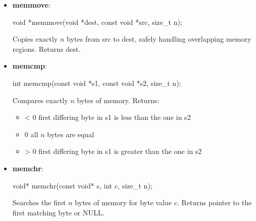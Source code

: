 \documentclass{report}
\begin{document}
\begin{itemize}
\begin{cppcode}
                    memcpy(dest, src, sizeof src);
            \end{cppcode}
            \bigbreak \noindent 
            Overlapping memory is UB.
        \item \textbf{memmove}: 
            \bigbreak \noindent 
            \begin{cppcode}
            void *memmove(void *dest, const void *src, size_t n);
            \end{cppcode}
            \bigbreak \noindent 
            Copies exactly $n$ bytes from src to dest, safely handling overlapping memory regions.
            \bigbreak \noindent 
            Returns dest.
        \item \textbf{memcmp}: 
            \bigbreak \noindent 
            \begin{cppcode}
            int memcmp(const void *s1, const void *s2, size_t n);
            \end{cppcode}
            \bigbreak \noindent 
            Compares exactly $n$ bytes of memory.
            \bigbreak \noindent 
            Returns:
            \begin{itemize}
                \item < 0   first differing byte in s1 is less than the one in s2
                \item 0   all $n$ bytes are equal
                \item > 0   first differing byte in s1 is greater than the one in s2
            \end{itemize}
        \item \textbf{memchr}: 
            \bigbreak \noindent 
            \begin{cppcode}
            void* memchr(const void* s, int c, size_t n); 
            \end{cppcode}
            \bigbreak \noindent 
            Searches the first $n$ bytes of memory for byte value $c$.
            \bigbreak \noindent 
            Returns pointer to the first matching byte or NULL.


    \end{itemize}

    \pagebreak 
\end{document}
